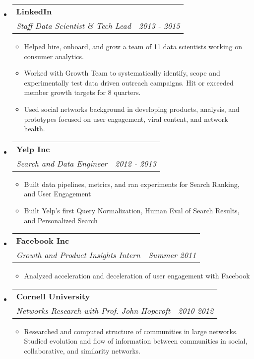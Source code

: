 \documentclass[letterpaper,11pt]{article}
\makeatletter
\newcommand{\resitem}[1]{\item #1 \vspace{-2pt}}
\newcommand{\ressubheading}[4]{

\begin{tabular*}{6.5in}{l@{\cftdotfill{\cftsecdotsep}\extracolsep{\fill}}r}

		\textbf{#1} & #2 \\

		\textit{#3} & \textit{#4} \\

\end{tabular*}\vspace{-6pt}}
\makeatother
\begin{document}
\begin{itemize}
	
\item[] 
	\ressubheading{\color{linkedincolor}LinkedIn}{}{Staff Data Scientist \& Tech Lead}{2013 - 2015}

	\begin{itemize}
	
		\resitem{Helped hire, onboard, and grow a team of 11 data scientists working on consumer analytics.}
		
		\resitem{Worked with Growth Team to systematically identify, scope and experimentally test data driven outreach campaigns. Hit or exceeded member growth targets for 8 quarters.}
		
		\resitem{Used social networks background in developing products, analysis, and prototypes focused on user engagement, viral content, and network health.}

		
	\end{itemize}

\item[] 
	\ressubheading{\color{yelpcolor}Yelp Inc}{}{Search and Data Engineer}{2012 - 2013}

	\begin{itemize}
		\resitem{Built data pipelines, metrics, and ran experiments for Search Ranking, and User Engagement}

		\resitem{Built Yelp's first Query Normalization, Human Eval of Search Results, and Personalized Search}

	\end{itemize}


\item[]

	\ressubheading{\color{facebookcolor}Facebook Inc}{}{Growth and Product Insights Intern}{Summer 2011}

	\begin{itemize}

		\resitem{Analyzed acceleration and deceleration of user engagement with Facebook}

	\end{itemize}


\item[]
	\ressubheading{\color{darkred}Cornell University}{}{Networks Research with Prof. John Hopcroft }{2010-2012}

	\begin{itemize}

		\resitem{Researched and computed structure of communities in large networks. Studied evolution and flow of information between communities in social, collaborative, and similarity networks.}


\end{itemize}
\end{itemize}
\end{document}
